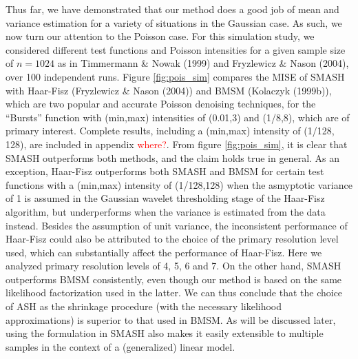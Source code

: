 \documentclass[12pt]{article}
\begin{document}
Thus far, we have demonstrated that our method does a good job of mean and variance estimation for a variety of situations in the Gaussian case. As such, we now turn our attention to the Poisson case. For this simulation study, we considered different test functions and Poisson intensities for a given sample size of $n=1024$ as in Timmermann \& Nowak (1999) and Fryzlewicz \& Nason (2004), over 100 independent runs. Figure \ref{fig:pois_sim} compares the MISE of SMASH with Haar-Fisz (Fryzlewicz \& Nason (2004)) and BMSM (Kolaczyk (1999b)), which are two popular and accurate Poisson denoising techniques, for the ``Bursts'' function with (min,max) intensities of (0.01,3) and (1/8,8), which are of primary interest. Complete results, including a (min,max) intensity of (1/128, 128), are included in appendix \textcolor{red}{where?}. From figure \ref{fig:pois_sim}, it is clear that SMASH outperforms both methods, and the claim holds true in general. As an exception, Haar-Fisz outperforms both SMASH and BMSM for certain test functions with a (min,max) intensity of (1/128,128) when the asmyptotic variance of 1 is assumed in the Gaussian wavelet thresholding stage of the Haar-Fisz algorithm, but underperforms when the variance is estimated from the data instead. Besides the assumption of unit variance, the inconsistent performance of Haar-Fisz could also be attributed to the choice of the primary resolution level used, which can substantially affect the performance of Haar-Fisz. Here we analyzed primary resolution levels of 4, 5, 6 and 7. On the other hand, SMASH outperforms BMSM consistently, even though our method is based on the same likelihood factorization used in the latter. We can thus conclude that the choice of ASH as the shrinkage procedure (with the necessary likelihood approximations) is superior to that used in BMSM. As will be discussed later, using the formulation in SMASH also makes it easily extensible to multiple samples in the context of a (generalized) linear model.
\end{document}
